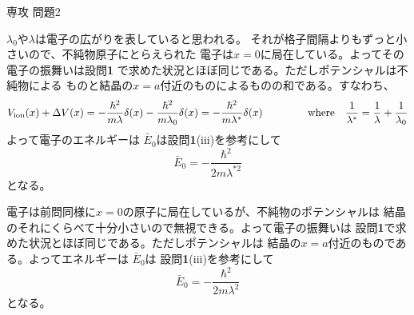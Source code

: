 \documentclass[fleqn]{jbook}
\begin{document}
\begin{answer}{専攻 問題2}{}
\begin{subanswers}
\begin{subsubanswers}
  \end{subsubanswers}

\SubAnswer
  \begin{subsubanswers}
  \SubSubAnswer
    $\lambda_0$や$\lambda$は電子の広がりを表していると思われる。
    それが格子間隔よりもずっと小さいので、不純物原子にとらえられた
    電子は$x=0$に局在している。よってその電子の振舞いは設問{\bf 1}
    で求めた状況とほぼ同じである。ただしポテンシャルは不純物による
    ものと結晶の$x=a$付近のものによるものの和である。すなわち、
%
    \[ V_{\rm ion}(x) + \Delta V(x)%
       = -\frac{\hbar^2}{m \lambda} \delta (x)%
         -\frac{\hbar^2}{m \lambda_0} \delta (x)%
       = -\frac{\hbar^2}{m \lambda^{\ast}} \delta (x) \hspace{15mm}%
       {\rm where} \quad \frac{1}{\lambda^{\ast}} = \frac{1}{\lambda} + \frac{1}{\lambda_0} \]
%
    よって電子のエネルギーは $\bar{E}_0$は設問{\bf 1}(iii)を参考にして
%
    \[ \bar{E}_0 = -\frac{\hbar^2}{2m\lambda^{\ast 2}} \]
%
    となる。

  \SubSubAnswer
    電子は前問同様に$x=0$の原子に局在しているが、不純物のポテンシャルは
    結晶のそれにくらべて十分小さいので無視できる。よって電子の振舞いは
    設問{\bf 1}で求めた状況とほぼ同じである。ただしポテンシャルは
    結晶の$x=a$付近のものである。よってエネルギーは $\bar{E}_0$は
    設問{\bf 1}(iii)を参考にして
%
    \[ \bar{E}_0 = -\frac{\hbar^2}{2m\lambda^{2}} \]
%
    となる。

  \end{subsubanswers}

\end{subanswers}
\end{answer}
\end{document}
